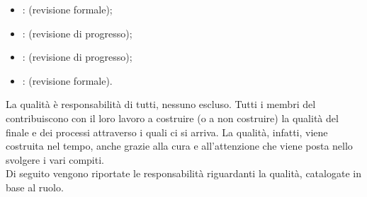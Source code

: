 		\begin{itemize}
			\item {}:  (revisione formale);
			\item {}:  (revisione di progresso);
			\item {}:  (revisione di progresso);
			\item {}:  (revisione formale).
		\end{itemize}
	 \label{subsec:responsabilita}
		La qualità è responsabilità di tutti, nessuno escluso. Tutti i membri del  contribuiscono con il loro lavoro a costruire (o a non costruire) la qualità del  finale e dei processi attraverso i quali ci si arriva. La qualità, infatti, viene costruita nel tempo, anche grazie alla cura e all'attenzione che viene posta nello svolgere i vari compiti. \\
		Di seguito vengono riportate le responsabilità riguardanti la qualità, catalogate in base al ruolo.
